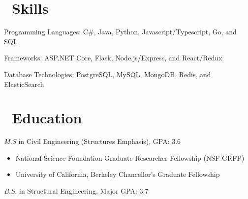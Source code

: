 \documentclass{resume}
\begin{document}

\section{\faCogs\ Skills}

  Programming Languages: C\#, Java, Python, Javascript/Typescript, Go, and SQL

  Frameworks: ASP.NET Core, Flask, Node.js/Express, and React/Redux
 
  Database Technologies: PostgreSQL, MySQL, MongoDB, Redis, and ElasticSearch
 


\section{\faGraduationCap\ Education}
\textit{M.S } in Civil Engineering (Structures Emphasis), GPA: 3.6

\begin{itemize}
 \item National Science Foundation Graduate Researcher Fellowship (NSF GRFP)
 \item University of California, Berkeley Chancellor's Graduate Fellowship
\end{itemize}

\textit{B.S.} in Structural Engineering, Major GPA: 3.7

%
%
\end{document}
